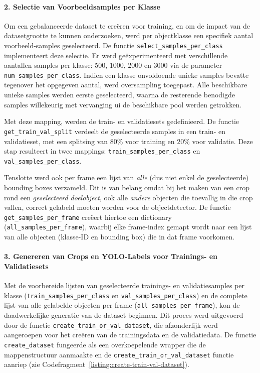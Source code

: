 \paragraph{2. Selectie van Voorbeeldsamples per Klasse}
Om een gebalanceerde dataset te creëren voor training, en om de impact van de datasetgrootte te kunnen onderzoeken, 
werd per objectklasse een specifiek aantal voorbeeld-samples geselecteerd. 
De functie \texttt{select\_samples\_per\_class} implementeert deze selectie. 
Er werd geëxperimenteerd met verschillende aantallen samples per klasse: 500, 1000, 2000 en 3000 via de parameter \texttt{num\_samples\_per\_class}.
Indien een klasse onvoldoende unieke samples bevatte tegenover het opgegeven aantal, werd oversampling toegepast.
Alle beschikbare unieke samples werden eerste geselecteerd, waarna de resterende benodigde samples willekeurig met vervanging ui de beschikbare pool werden getrokken.

Met deze mapping, werden de train- en validatiesets gedefinieerd.
De functie \texttt{get\_train\_val\_split} verdeelt de geselecteerde samples in een train- en validatieset,
met een splitsing van 80\% voor training en 20\% voor validatie.
Deze stap resulteert in twee mappings: \texttt{train\_samples\_per\_class} en \texttt{val\_samples\_per\_class}.

Tenslotte werd ook per frame een lijst van \textit{alle} (dus niet enkel de geselecteerde) bounding boxes verzameld.
Dit is van belang omdat bij het maken van een crop rond een \textit{geselecteerd doelobject},
ook alle \textit{andere} objecten die toevallig in die crop vallen, correct gelabeld moeten worden voor de objectdetector.
De functie \texttt{get\_samples\_per\_frame} creëert hiertoe een dictionary (\texttt{all\_samples\_per\_frame}), 
waarbij elke frame-index gemapt wordt naar een lijst van alle objecten (klasse-ID en bounding box) die in dat frame voorkomen.

\paragraph{3. Genereren van Crops en YOLO-Labels voor Trainings- en Validatiesets}
Met de voorbereide lijsten van geselecteerde trainings- en validatiesamples per 
klasse (\texttt{train\_samples\_per\_class} en \texttt{val\_samples\_per\_class}) 
en de complete lijst van alle gelabelde objecten per frame (\texttt{all\_samples\_per\_frame}), 
kon de daadwerkelijke generatie van de dataset beginnen. 
Dit proces werd uitgevoerd door de functie \texttt{create\_train\_or\_val\_dataset}, 
die afzonderlijk werd aangeroepen voor het creëren van de trainingsdata en de validatiedata. 
De functie \texttt{create\_dataset} fungeerde als een overkoepelende wrapper die de mappenstructuur 
aanmaakte en de \texttt{create\_train\_or\_val\_dataset} functie aanriep (zie Codefragment~{\ref{listing:create-train-val-dataset}}).

